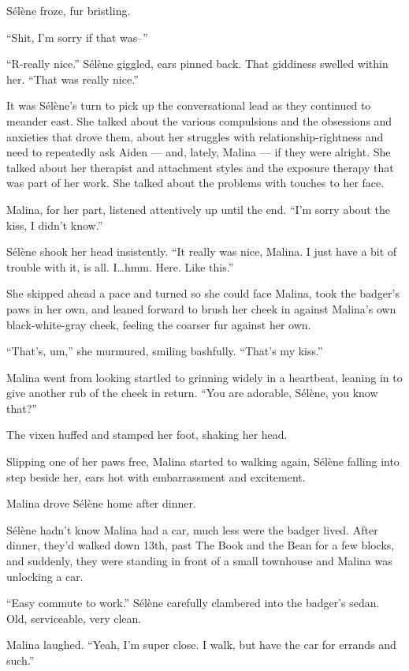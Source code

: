 Sélène froze, fur bristling.

``Shit, I'm sorry if that was--''

``R-really nice.'' Sélène giggled, ears pinned back. That giddiness swelled within her. ``That was really nice.''

It was Sélène's turn to pick up the conversational lead as they continued to meander east. She talked about the various compulsions and the obsessions and anxieties that drove them, about her struggles with relationship-rightness and need to repeatedly ask Aiden --- and, lately, Malina --- if they were alright. She talked about her therapist and attachment styles and the exposure therapy that was part of her work. She talked about the problems with touches to her face.

Malina, for her part, listened attentively up until the end. ``I'm sorry about the kiss, I didn't know.''

Sélène shook her head insistently. ``It really was nice, Malina. I just have a bit of trouble with it, is all. I\ldots{}hmm. Here. Like this.''

She skipped ahead a pace and turned so she could face Malina, took the badger's paws in her own, and leaned forward to brush her cheek in against Malina's own black-white-gray cheek, feeling the coarser fur against her own.

``That's, um,'' she murmured, smiling bashfully. ``That's my kiss.''

Malina went from looking startled to grinning widely in a heartbeat, leaning in to give another rub of the cheek in return. ``You are adorable, Sélène, you know that?''

The vixen huffed and stamped her foot, shaking her head.

Slipping one of her paws free, Malina started to walking again, Sélène falling into step beside her, ears hot with embarrassment and excitement.

\secdiv{}

\noindent Malina drove Sélène home after dinner.

Sélène hadn't know Malina had a car, much less were the badger lived. After dinner, they'd walked down 13th, past The Book and the Bean for a few blocks, and suddenly, they were standing in front of a small townhouse and Malina was unlocking a car.

``Easy commute to work.'' Sélène carefully clambered into the badger's sedan. Old, serviceable, very clean.

Malina laughed. ``Yeah, I'm super close. I walk, but have the car for errands and such.''

